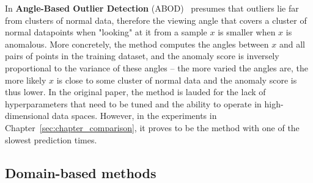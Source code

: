 In \textbf{Angle-Based Outlier Detection} (ABOD)~\cite{kriegel2008angle} presumes that outliers lie far from clusters of normal data, therefore the viewing angle that covers a cluster of normal datapoints when "looking" at it from a sample $x$ is smaller when $x$ is anomalous. More concretely, the method computes the angles between $x$ and all pairs of points in the training dataset, and the anomaly score is inversely proportional to the variance of these angles -- the more varied the angles are, the more likely $x$ is close to some cluster of normal data and the anomaly score is thus lower. In the original paper, the method is lauded for the lack of hyperparameters that need to be tuned and the ability to operate in high-dimensional data spaces. However, in the experiments in Chapter~\ref{sec:chapter_comparison}, it proves to be the method with one of the slowest prediction times.

\subsection{Domain-based  methods} \label{sec:domain_methods}
